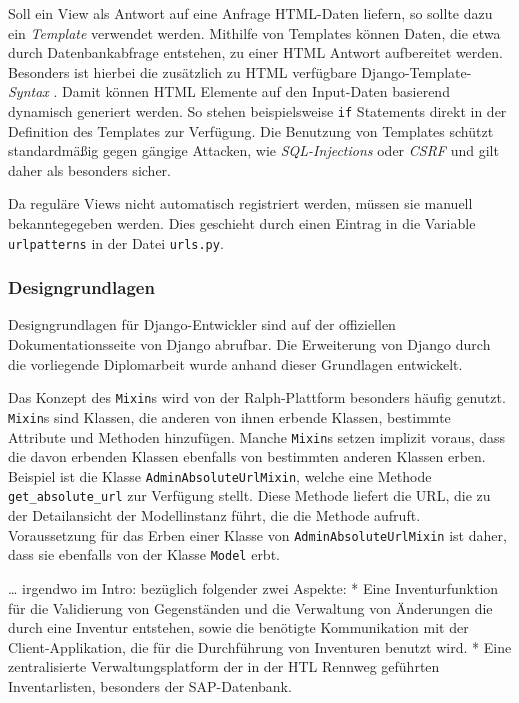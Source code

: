 Soll ein View als Antwort auf eine Anfrage HTML-Daten liefern, so sollte
dazu ein \emph{Template}
verwendet werden. Mithilfe von Templates können Daten, die etwa durch
Datenbankabfrage entstehen, zu einer HTML Antwort aufbereitet werden.
Besonders ist hierbei die zusätzlich zu HTML verfügbare
Django-Template-\emph{Syntax}
\cite{django-doku-template}. Damit können HTML Elemente auf den
Input-Daten basierend dynamisch generiert werden. So stehen
beispielsweise \texttt{if} Statements direkt in der Definition des
Templates zur Verfügung. Die Benutzung von Templates schützt
standardmäßig gegen gängige Attacken, wie
\emph{SQL-Injections}
oder
\emph{CSRF}\cite{csrf}
und gilt daher als besonders sicher.

Da reguläre Views nicht automatisch registriert werden, müssen sie
manuell bekanntegegeben werden. Dies geschieht durch einen Eintrag in
die Variable \texttt{urlpatterns} in der Datei \texttt{urls.py}.
\cite{django-doku-urls}

\hypertarget{designgrundlagen}{%
\subsubsection{Designgrundlagen}\label{designgrundlagen}}

Designgrundlagen für Django-Entwickler sind auf der offiziellen
Dokumentationsseite von Django abrufbar. \cite{django-doku-coding-style}
Die Erweiterung von Django durch die vorliegende Diplomarbeit wurde
anhand dieser Grundlagen entwickelt.

Das Konzept des \texttt{Mixin}s wird von der Ralph-Plattform besonders
häufig genutzt. \texttt{Mixin}s sind Klassen, die anderen von ihnen
erbende Klassen, bestimmte Attribute und Methoden hinzufügen. Manche
\texttt{Mixin}s setzen implizit voraus, dass die davon erbenden Klassen
ebenfalls von bestimmten anderen Klassen erben. Beispiel ist die Klasse
\texttt{AdminAbsoluteUrlMixin}, welche eine Methode
\texttt{get\_absolute\_url} zur Verfügung stellt. Diese Methode liefert
die URL, die zu der Detailansicht der Modellinstanz führt, die die
Methode aufruft. Voraussetzung für das Erben einer Klasse von
\texttt{AdminAbsoluteUrlMixin} ist daher, dass sie ebenfalls von der
Klasse \texttt{Model} erbt.


\ldots{} irgendwo im Intro: bezüglich folgender zwei Aspekte: * Eine
Inventurfunktion für die Validierung von Gegenständen und die Verwaltung
von Änderungen die durch eine Inventur entstehen, sowie die benötigte
Kommunikation mit der Client-Applikation, die für die Durchführung von
Inventuren benutzt wird. * Eine zentralisierte Verwaltungsplatform der
in der HTL Rennweg geführten Inventarlisten, besonders der
SAP-Datenbank.
